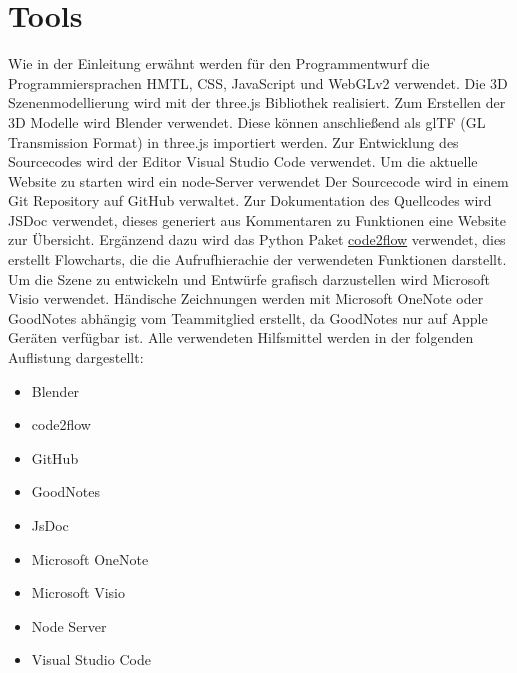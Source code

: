 \section{Tools}
Wie in der Einleitung erwähnt werden für den Programmentwurf die
Programmiersprachen HMTL, CSS, JavaScript und WebGLv2 verwendet.
Die 3D Szenenmodellierung wird mit der three.js Bibliothek realisiert.
Zum Erstellen der 3D Modelle wird Blender verwendet. Diese können anschließend als
glTF (GL Transmission Format) in three.js importiert werden.
\newparagraph
Zur Entwicklung des Sourcecodes wird der Editor Visual Studio Code verwendet.
Um die aktuelle Website zu starten wird ein node-Server verwendet
Der Sourcecode wird in einem Git Repository auf GitHub verwaltet.
Zur Dokumentation des Quellcodes wird JSDoc verwendet, dieses generiert aus Kommentaren zu Funktionen eine Website zur Übersicht.
Ergänzend dazu wird das Python Paket \href{https://github.com/scottrogowski/code2flow}{code2flow} verwendet, dies erstellt Flowcharts,
die die Aufrufhierachie der verwendeten Funktionen darstellt.
\newparagraph
Um die Szene zu entwickeln und Entwürfe grafisch darzustellen wird Microsoft Visio verwendet.
Händische Zeichnungen werden mit Microsoft OneNote oder GoodNotes abhängig vom Teammitglied erstellt,
da GoodNotes nur auf Apple Geräten verfügbar ist.
\newparagraph
Alle verwendeten Hilfsmittel werden in der folgenden Auflistung dargestellt:
\begin{itemize}
  \item Blender
  \item code2flow
  \item GitHub
  \item GoodNotes
  \item JsDoc
  \item Microsoft OneNote
  \item Microsoft Visio
  \item Node Server
  \item Visual Studio Code
\end{itemize}